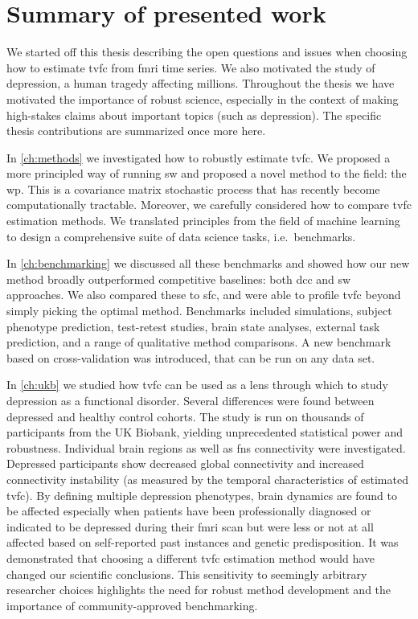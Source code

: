 \clearpage
\section{Summary of presented work}

We started off this thesis describing the open questions and issues when choosing how to estimate \gls{tvfc} from \gls{fmri} time series.
We also motivated the study of depression, a human tragedy affecting millions.
Throughout the thesis we have motivated the importance of robust science, especially in the context of making high-stakes claims about important topics (such as depression).
The specific thesis contributions are summarized once more here.

In \cref{ch:methods} we investigated how to robustly estimate \gls{tvfc}.
We proposed a more principled way of running \gls{sw} and proposed a novel method to the field: the \gls{wp}.
This is a covariance matrix stochastic process that has recently become computationally tractable.
Moreover, we carefully considered how to compare \gls{tvfc} estimation methods.
We translated principles from the field of machine learning to design a comprehensive suite of data science tasks, i.e.~benchmarks.

In \cref{ch:benchmarking} we discussed all these benchmarks and showed how our new method broadly outperformed competitive baselines: both \gls{dcc} and \gls{sw} approaches.
We also compared these to \gls{sfc}, and were able to profile \gls{tvfc} beyond simply picking the optimal method.
Benchmarks included simulations, subject phenotype prediction, test-retest studies, brain state analyses, external task prediction, and a range of qualitative method comparisons.
A new benchmark based on cross-validation was introduced, that can be run on any data set.

In \cref{ch:ukb} we studied how \gls{tvfc} can be used as a lens through which to study depression as a functional disorder.
Several differences were found between depressed and healthy control cohorts.
The study is run on thousands of participants from the UK Biobank, yielding unprecedented statistical power and robustness.
Individual brain regions as well as \glspl{fn} connectivity were investigated.
Depressed participants show decreased global connectivity and increased connectivity instability (as measured by the temporal characteristics of estimated \gls{tvfc}).
By defining multiple depression phenotypes, brain dynamics are found to be affected especially when patients have been professionally diagnosed or indicated to be depressed during their \gls{fmri} scan but were less or not at all affected based on self-reported past instances and genetic predisposition.
It was demonstrated that choosing a different \gls{tvfc} estimation method would have changed our scientific conclusions.
This sensitivity to seemingly arbitrary researcher choices highlights the need for robust method development and the importance of community-approved benchmarking.

